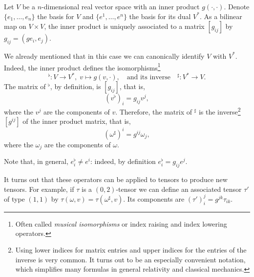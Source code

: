 \begin{example}\label{ex:musicaliso}
  Let $V$ be a $n$-dimensional real vector space with an inner product $g(\cdot, \cdot)$.
  Denote $\{e_1, \ldots, e_n\}$ the basis for $V$ and $\{e^1, \ldots, e^n\}$ the basis for its dual $V^*$.
  As a bilinear map on $V\times V$, the inner product is uniquely associated to a matrix $[g_{ij}]$ by $g_{ij} = (g e_i, e_j)$.

  We already mentioned that in this case we can canonically identify $V$ with $V^*$.
  Indeed, the inner product defines the isomorphisms\footnote{Often called \emph{musical isomorphisms} or index raising and index lowering operators.}
  \begin{equation}
    {}^\flat: V \to V^*,\; v\mapsto g(v, \cdot),
    \quad\mbox{and its inverse}\quad
    {}^\sharp: V^*\to V.
  \end{equation}
  The matrix of ${}^\flat$, by definition, is $[g_{ij}]$, that is,
  \begin{equation}
    (v^\flat)_i = g_{ij} v^j,
  \end{equation}
  where the $v^j$ are the components of $v$.
  Therefore, the matrix of ${}^\sharp$ is the inverse\footnote{Using lower indices for matrix entries and upper indices for the entries of the inverse is very common. It turns out to be an especially convenient notation, which simplifies many formulas in general relativity and classical mechanics.} $[g^{ij}]$ of the inner product matrix, that is, 
  \begin{equation}
    (\omega^\sharp)^i = g^{ij}\omega_j,
  \end{equation}
  where the $\omega_j$ are the components of $\omega$.

  Note that, in general, $e^\flat_i\neq e^i$: indeed, by definition $e^\flat_i = g_{ij}e^j$.

  It turns out that these operators can be applied to tensors to produce new tensors.
  For example, if $\tau$ is a $(0,2)$-tensor we can define an associated tensor $\tau'$ of type $(1,1)$ by $\tau(\omega, v) = \tau(\omega^\sharp, v)$.
  Its components are $(\tau')_i^j = g^{jk}\tau_{ik}$.
\end{example}


